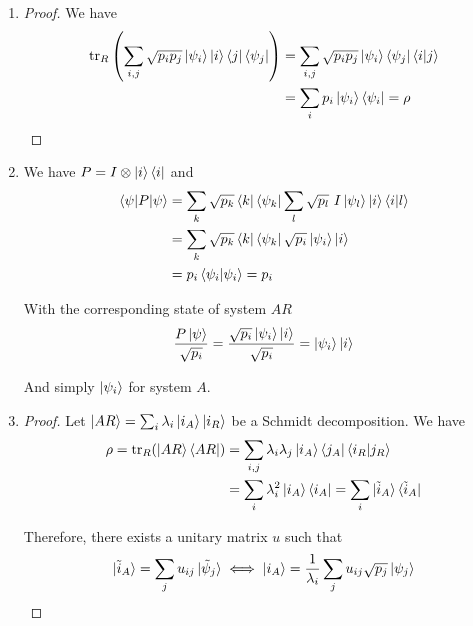 \documentclass[../main.tex]{subfiles}
\begin{document}
\bigskip
\begin{exercise}
\end{exercise}
\begin{enumerate}
    \item
    \begin{proof}
        We have
        \begin{align*}
            \mathrm{tr}_R\left(\sum_{i,j}\sqrt{p_i p_j}\ket{\psi_i}\ket{i}\bra{j}\bra{\psi_j}\right) 
            &= \sum_{i,j}\sqrt{p_i p_j}\ket{\psi_i}\bra{\psi_j}\braket{i\vert j} \\
            &= \sum_i p_i\ket{\psi_i}\bra{\psi_i} = \rho
        \end{align*}
    \end{proof}
    
    \item
    We have $P=I\otimes \ket{i}\bra{i}$ and
    \begin{align*}
        \braket{\psi\vert P\vert\psi}
        &= \sum_k \sqrt{p_k}\bra{k}\bra{\psi_k} \sum_l \sqrt{p_l}\ I \ket{\psi_l} \ket{i}\braket{i\vert l} \\
        &= \sum_k \sqrt{p_k}\bra{k}\bra{\psi_k} \sqrt{p_i}\ket{\psi_i}\ket{i} \\
        &= p_i \braket{\psi_i \vert \psi_i} = p_i
    \end{align*}
    
    With the corresponding state of system $AR$
    \begin{equation*}
        \frac{P\ket{\psi}}{\sqrt{p_i}} = \frac{\sqrt{p_i}\ket{\psi_i}\ket{i}}{\sqrt{p_i}} = \ket{\psi_i}\ket{i}
    \end{equation*}
    
    And simply $\ket{\psi_i}$ for system $A$.
    
    \item
    \begin{proof}
        Let $\ket{AR}=\sum_i \lambda_i\ket{i_A}\ket{i_R}$ be a Schmidt decomposition. We have
        \begin{align*}
            \rho = \mathrm{tr}_R(\ket{AR}\bra{AR})
            &= \sum_{i, j} \lambda_i \lambda_j \ket{i_A}\bra{j_A}\braket{i_R\vert j_R} \\
            &= \sum_i \lambda_i^2 \ket{i_A}\bra{i_A} 
            = \sum_i \ket{\tilde{i}_A} \bra{\tilde{i}_A}
        \end{align*}
        
        Therefore, there exists a unitary matrix $u$ such that
        \begin{equation*}
            \ket{\tilde{i}_A} = \sum_j u_{i j} \ket{\tilde{\psi}_j}
            \iff \ket{i_A} = \frac{1}{\lambda_i}\sum_j u_{i j}\sqrt{p_j}\ket{\psi_j}
        \end{equation*}
        

\end{proof}
\end{enumerate}
\end{document}
